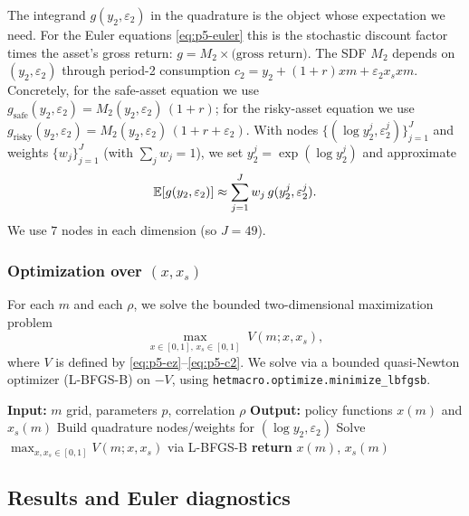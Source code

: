 The integrand $g(y_2,\varepsilon_2)$ in the quadrature is the object whose expectation we need. For the Euler equations \eqref{eq:p5-euler} this is the stochastic discount factor times the asset's gross return: $g = M_2 \times \text{(gross return)}$. The SDF $M_2$ depends on $(y_2,\varepsilon_2)$ through period-2 consumption $c_2 = y_2 + (1+r)xm + \varepsilon_2 x_s xm$. Concretely, for the safe-asset equation we use $g_{\text{safe}}(y_2,\varepsilon_2) = M_2(y_2,\varepsilon_2)\,(1+r)$; for the risky-asset equation we use $g_{\text{risky}}(y_2,\varepsilon_2) = M_2(y_2,\varepsilon_2)\,(1+r+\varepsilon_2)$. With nodes $\{(\log y_2^j,\varepsilon_2^j)\}_{j=1}^J$ and weights $\{w_j\}_{j=1}^J$ (with $\sum_j w_j=1$), we set $y_2^j = \exp(\log y_2^j)$ and approximate
\begin{equation}
  \mathbb{E}[g(y_2,\varepsilon_2)] \approx \sum_{j=1}^J w_j\, g(y_2^j,\varepsilon_2^j).
\end{equation}
We use $7$ nodes in each dimension (so $J=49$). 

\subsubsection{Optimization over $(x,x_s)$}

For each $m$ and each $\rho$, we solve the bounded two-dimensional maximization problem
\begin{equation}
  \max_{x\in[0,1],\,x_s\in[0,1]} \; V(m;x,x_s),
\end{equation}
where $V$ is defined by \eqref{eq:p5-ez}--\eqref{eq:p5-c2}. We solve via a bounded quasi-Newton optimizer (L-BFGS-B) on $-V$, using \texttt{hetmacro.optimize.minimize\_lbfgsb}.

\begin{algorithm}[H]
\caption{Solve policies for each $m$ and $\rho$}
\label{alg:p5-solve}
\begin{algorithmic}[1]
\State \textbf{Input:} $m$ grid, parameters $p$, correlation $\rho$
\State \textbf{Output:} policy functions $x(m)$ and $x_s(m)$
\State Build quadrature nodes/weights for $(\log y_2,\varepsilon_2)$
  \State Solve $\max_{x,x_s\in[0,1]} V(m;x,x_s)$ via L-BFGS-B
\EndFor
\State \textbf{return} $x(m)$, $x_s(m)$
\end{algorithmic}
\end{algorithm}

\subsection{Results and Euler diagnostics}

